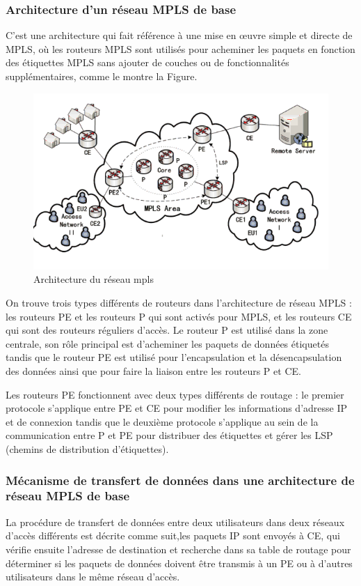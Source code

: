 \subsubsection{Architecture d'un réseau MPLS de base }
C’est une architecture qui fait référence à une mise en œuvre simple et directe de MPLS, où les routeurs MPLS sont utilisés pour acheminer les paquets en fonction des étiquettes MPLS sans ajouter de couches ou de fonctionnalités supplémentaires, comme le montre la Figure.
\begin{figure} [H]
	\begin{center}
		\centering
		\hspace*{-0.5cm}
		\includegraphics[width=0.67\linewidth]{Images/architecture-mpls}
	\end{center}
	\caption{Architecture du réseau mpls}
\end{figure} 


On trouve trois types différents de routeurs dans l'architecture de réseau MPLS : les routeurs PE et les routeurs P qui sont activés pour MPLS, et les routeurs CE qui sont des routeurs réguliers d'accès. Le routeur P est utilisé dans la zone centrale, son rôle principal est d’acheminer les paquets de données étiquetés tandis que le routeur PE est utilisé pour l'encapsulation et la désencapsulation des données ainsi que pour faire la liaison entre les routeurs P et CE.

Les routeurs PE fonctionnent avec deux types différents de routage : le premier protocole s’applique entre PE et CE pour modifier les informations d’adresse IP et de connexion tandis que le deuxième protocole s’applique au sein de la communication entre P et PE pour distribuer des étiquettes et gérer les LSP (chemins de distribution d’étiquettes).
 \subsubsection{Mécanisme de transfert de données dans une architecture de réseau MPLS de base  }
 La procédure de transfert de données entre deux utilisateurs dans deux réseaux d'accès différents est décrite comme suit,les paquets IP sont envoyés à CE, qui vérifie ensuite l'adresse de destination et recherche dans sa table de routage pour déterminer si les paquets de données doivent être transmis à un PE ou à d'autres utilisateurs dans le même réseau d'accès. 
 

